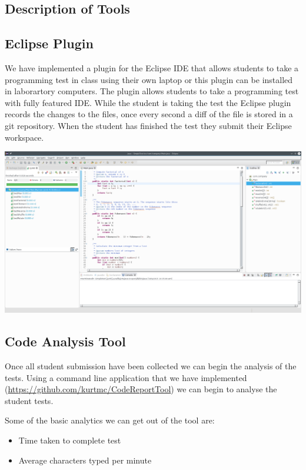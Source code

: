 \documentclass[a1,portrait]{a0poster}
\begin{document}
\begin{multicols}{2}
\color{DarkSlateGray} %

\section*{Description of Tools}

\subsection*{Eclipse Plugin}

We have implemented a plugin for the Eclipse IDE that allows students to take a
programming test in class using their own laptop or this plugin can be
installed in laborartory computers. The plugin allows students to take a
programming test with fully featured IDE. While the student is taking the test
the Eclipse plugin records the changes to the files, once every second a diff
of the file is stored in a git repository. When the student has finished the
test they submit their Eclipse workspace.

\begin{center}\vspace{1cm}
\includegraphics[width=0.8\linewidth]{eclipse}
\end{center}\vspace{1cm}

\subsection*{Code Analysis Tool}

Once all student submission have been collected we can begin the analysis of
the tests. Using a command line application that we have implemented
(\url{https://github.com/kurtmc/CodeReportTool}) we can begin to analyse the
student tests.

Some of the basic analytics we can get out of the tool are:
\begin{itemize}
	\item Time taken to complete test
	\item Average characters typed per minute
\end{itemize}


\end{multicols}
\end{document}
